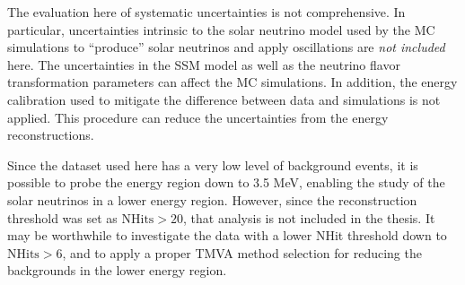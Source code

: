 The evaluation here of systematic uncertainties is not comprehensive. In particular, uncertainties intrinsic to the solar neutrino model used by the MC simulations to ``produce'' solar neutrinos and apply oscillations are {\em not included} here. The uncertainties in the SSM model as well as the neutrino flavor transformation parameters can affect the MC simulations. In addition, the energy calibration used to mitigate the difference between data and simulations is not applied. This procedure can reduce the uncertainties from the energy reconstructions. 

Since the dataset used here has a very low level of background events, it is possible to probe the energy region down to 3.5 MeV, enabling the study of the solar neutrinos in a lower energy region. However, since the reconstruction threshold was set as $\mathrm{NHits}>20$, that analysis is not included in the thesis. It may be worthwhile to investigate the data with a lower NHit threshold down to $\mathrm{NHits}>6$, and to apply a proper TMVA method selection for reducing the backgrounds in the lower energy region.

